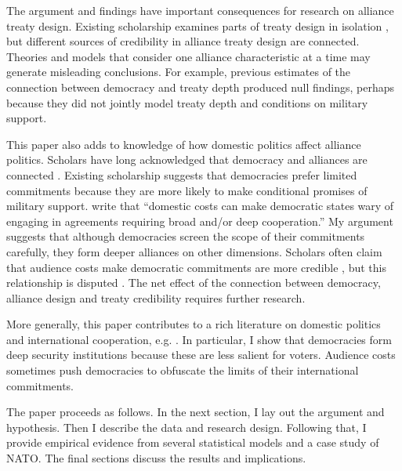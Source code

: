 \documentclass[12pt]{article}
\begin{document}
The argument and findings have important consequences for research on alliance treaty design. 
Existing scholarship examines parts of treaty design in isolation \citep{Benson2012, Mattes2012, Chibaetal2015}, but different sources of credibility in alliance treaty design are connected. 
Theories and models that consider one alliance characteristic at a time may generate misleading conclusions. 
For example, previous estimates of the connection between democracy and treaty depth produced null findings, perhaps because they did not jointly model treaty depth and conditions on military support. 


This paper also adds to knowledge of how domestic politics affect alliance politics. 
Scholars have long acknowledged that democracy and alliances are connected \citep{LaiReiter2000, GiblerWolford2006, Mattes2012, Warren2016, McManusYarhi-Milo2017}. 
Existing scholarship suggests that democracies prefer limited commitments \citep{Mattes2012, Chibaetal2015} because they are more likely to make conditional promises of military support. 
\citet{Chibaetal2015} write that ``domestic costs can make democratic states wary of engaging in agreements requiring broad and/or deep cooperation.'' 
My argument suggests that although democracies screen the scope of their commitments carefully, they form deeper alliances on other dimensions.  
Scholars often claim that audience costs make democratic commitments are more credible \citep{Gaubatz1996, Leedsetal2009, DigiuseppePoast2016}, but this relationship is disputed \citep{GartzkeGleditsch2004, DownesSechser2012}. 
The net effect of the connection between democracy, alliance design and treaty credibility requires further research. 


More generally, this paper contributes to a rich literature on domestic politics and international cooperation, e.g. \citep{DownesRocke1995, Fearon1998, Leeds1999, MattesRodriguez2014}. 
In particular, I show that democracies form deep security institutions because these are less salient for voters. 
Audience costs sometimes push democracies to obfuscate the limits of their international commitments. 


The paper proceeds as follows. 
In the next section, I lay out the argument and hypothesis. 
Then I describe the data and research design. 
Following that, I provide empirical evidence from several statistical models and a case study of NATO. 
The final sections discuss the results and implications. 
\end{document}
